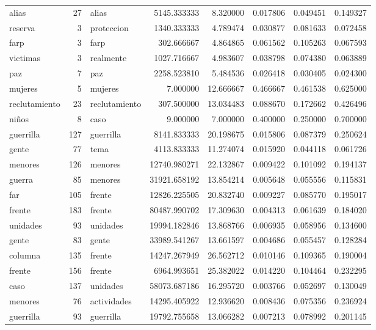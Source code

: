 \begin{tabular}{lrlrrrrr}
alias & 27 & alias & 5145.333333 & 8.320000 & 0.017806 & 0.049451 & 0.149327 \\
reserva & 3 & proteccion & 1340.333333 & 4.789474 & 0.030877 & 0.081633 & 0.072458 \\
farp & 3 & farp & 302.666667 & 4.864865 & 0.061562 & 0.105263 & 0.067593 \\
victimas & 3 & realmente & 1027.716667 & 4.983607 & 0.038798 & 0.074380 & 0.063889 \\
paz & 7 & paz & 2258.523810 & 5.484536 & 0.026418 & 0.030405 & 0.024300 \\
mujeres & 5 & mujeres & 7.000000 & 12.666667 & 0.466667 & 0.461538 & 0.625000 \\
reclutamiento & 23 & reclutamiento & 307.500000 & 13.034483 & 0.088670 & 0.172662 & 0.426496 \\
niños & 8 & caso & 9.000000 & 7.000000 & 0.400000 & 0.250000 & 0.700000 \\
guerrilla & 127 & guerrilla & 8141.833333 & 20.198675 & 0.015806 & 0.087379 & 0.250624 \\
gente & 77 & tema & 4113.833333 & 11.274074 & 0.015920 & 0.044118 & 0.061726 \\
menores & 126 & menores & 12740.980271 & 22.132867 & 0.009422 & 0.101092 & 0.194137 \\
guerra & 85 & menores & 31921.658192 & 13.854214 & 0.005648 & 0.055556 & 0.115831 \\
far & 105 & frente & 12826.225505 & 20.832740 & 0.009227 & 0.085770 & 0.195017 \\
frente & 183 & frente & 80487.990702 & 17.309630 & 0.004313 & 0.061639 & 0.184020 \\
unidades & 93 & unidades & 19994.182846 & 13.868766 & 0.006935 & 0.058956 & 0.134600 \\
gente & 83 & gente & 33989.541267 & 13.661597 & 0.004686 & 0.055457 & 0.128284 \\
columna & 135 & frente & 14247.267949 & 26.562712 & 0.010146 & 0.109365 & 0.190004 \\
frente & 156 & frente & 6964.993651 & 25.382022 & 0.014220 & 0.104464 & 0.232295 \\
caso & 137 & unidades & 58073.687186 & 16.295720 & 0.003766 & 0.052697 & 0.130049 \\
menores & 76 & actividades & 14295.405922 & 12.936620 & 0.008436 & 0.075356 & 0.236924 \\
guerrilla & 93 & guerrilla & 19792.755658 & 13.066282 & 0.007213 & 0.078992 & 0.201145 \\

\end{tabular}
